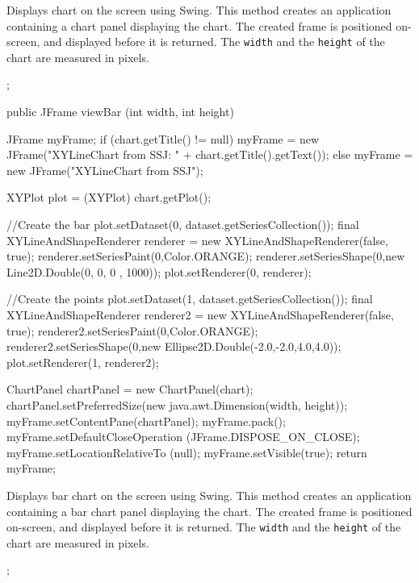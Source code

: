 \begin{tabb}
   Displays chart on the screen using Swing.
   This method creates an application containing a chart panel displaying
   the chart. The created frame is positioned on-screen, and displayed before
   it is returned. The \texttt{width} and the \texttt{height}
   of the chart are measured in pixels.
\end{tabb}
\begin{htmlonly}
   ;
\end{htmlonly}
\begin{code}
   public JFrame viewBar (int width, int height) \begin{hide} {
      JFrame myFrame;
      if (chart.getTitle() != null)
         myFrame = new JFrame("XYLineChart from SSJ: " + chart.getTitle().getText());
      else
         myFrame = new JFrame("XYLineChart from SSJ");

      XYPlot plot = (XYPlot) chart.getPlot();

      //Create the bar
      plot.setDataset(0, dataset.getSeriesCollection());
      final XYLineAndShapeRenderer renderer = new XYLineAndShapeRenderer(false, true);
      renderer.setSeriesPaint(0,Color.ORANGE);
      renderer.setSeriesShape(0,new Line2D.Double(0, 0, 0 , 1000));
      plot.setRenderer(0, renderer);

      //Create the points
      plot.setDataset(1, dataset.getSeriesCollection());
      final XYLineAndShapeRenderer renderer2 = new XYLineAndShapeRenderer(false, true);
      renderer2.setSeriesPaint(0,Color.ORANGE);
      renderer2.setSeriesShape(0,new Ellipse2D.Double(-2.0,-2.0,4.0,4.0));
      plot.setRenderer(1, renderer2);

      ChartPanel chartPanel = new ChartPanel(chart);
      chartPanel.setPreferredSize(new java.awt.Dimension(width, height));
      myFrame.setContentPane(chartPanel);
      myFrame.pack();
      myFrame.setDefaultCloseOperation (JFrame.DISPOSE_ON_CLOSE);
      myFrame.setLocationRelativeTo (null);
      myFrame.setVisible(true);
      return myFrame;
   }\end{hide}
\end{code}
\begin{tabb}
   Displays bar chart on the screen using Swing.
   This method creates an application containing a bar chart panel displaying
   the chart.  The created frame is positioned on-screen, and displayed before
   it is returned. The \texttt{width} and the \texttt{height}
   of the chart are measured in pixels.
\end{tabb}
\begin{htmlonly}
   ;
\end{htmlonly}

